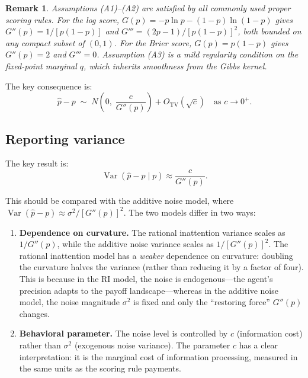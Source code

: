 \documentclass[11pt]{article}
\newtheorem{remark}{Remark}
\begin{document}
\begin{remark}
Assumptions (A1)--(A2) are satisfied by all commonly used proper scoring rules. For the log score, $G(p) = -p\ln p - (1-p)\ln(1-p)$ gives $G''(p) = 1/[p(1-p)]$ and $G''' = (2p-1)/[p(1-p)]^2$, both bounded on any compact subset of $(0,1)$. For the Brier score, $G(p) = p(1-p)$ gives $G''(p) = 2$ and $G''' = 0$. Assumption (A3) is a mild regularity condition on the fixed-point marginal $q$, which inherits smoothness from the Gibbs kernel.
\end{remark}

The key consequence is:
\begin{equation}\label{eq:ri-gaussian}
\hat{p} - p \;\sim\; N\!\left(0,\; \frac{c}{G''(p)}\right) + O_{\mathrm{TV}}(\sqrt{c}) \quad \text{as } c \to 0^+.
\end{equation}

\subsection{Reporting variance}

The key result is:
\begin{equation}\label{eq:ri-variance}
\boxed{\operatorname{Var}(\hat{p} - p \mid p) \approx \frac{c}{G''(p)}.}
\end{equation}

This should be compared with the additive noise model, where $\operatorname{Var}(\hat{p} - p) \approx \sigma^2/[G''(p)]^2$. The two models differ in two ways:
\begin{enumerate}
\item \textbf{Dependence on curvature.} The rational inattention variance scales as $1/G''(p)$, while the additive noise variance scales as $1/[G''(p)]^2$. The rational inattention model has a \emph{weaker} dependence on curvature: doubling the curvature halves the variance (rather than reducing it by a factor of four). This is because in the RI model, the noise is endogenous---the agent's precision adapts to the payoff landscape---whereas in the additive noise model, the noise magnitude $\sigma^2$ is fixed and only the ``restoring force'' $G''(p)$ changes.

\item \textbf{Behavioral parameter.} The noise level is controlled by $c$ (information cost) rather than $\sigma^2$ (exogenous noise variance). The parameter $c$ has a clear interpretation: it is the marginal cost of information processing, measured in the same units as the scoring rule payments.
\end{enumerate}
\end{document}
